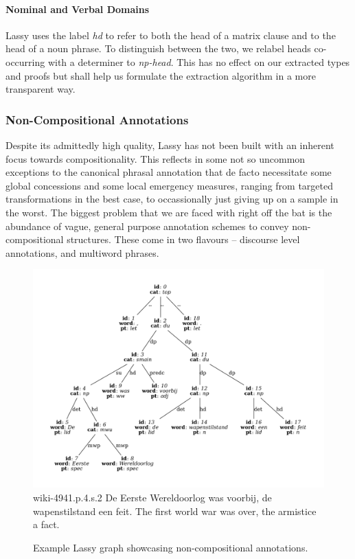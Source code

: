 \paragraph{Nominal and Verbal Domains}
Lassy uses the label \textit{hd} to refer to both the head of a matrix clause and to the head of a noun phrase.
To distinguish between the two, we relabel heads co-occurring with a determiner to \textit{np-head}.
This has no effect on our extracted types and proofs but shall help us formulate the extraction algorithm in a more transparent way.

\subsubsection{Non-Compositional Annotations}
Despite its admittedly high quality, Lassy has not been built with an inherent focus towards compositionality.
This reflects in some not so uncommon exceptions to the canonical phrasal annotation that de facto necessitate some global concessions and some local emergency measures, ranging from targeted transformations in the best case, to occassionally just giving up on a sample in the worst.
The biggest problem that we are faced with right off the bat is the abundance of vague, general purpose annotation schemes to convey non-compositional structures.
These come in two flavours -- discourse level annotations, and multiword phrases.

\begin{figure}
	\includegraphics[width=1\textwidth,trim={1.25cm 0 1.25cm 0}, clip]{./prebuilt/du_mwp_example.pdf}
	\lassycap
		{wiki-4941.p.4.s.2}
		{De Eerste Wereldoorlog was voorbij, de wapenstilstand een feit.}
		{The first world war was over, the armistice a fact.}
	\caption{Example Lassy graph showcasing non-compositional annotations.}
	\label{figure:du_mwp_example}
\end{figure}

